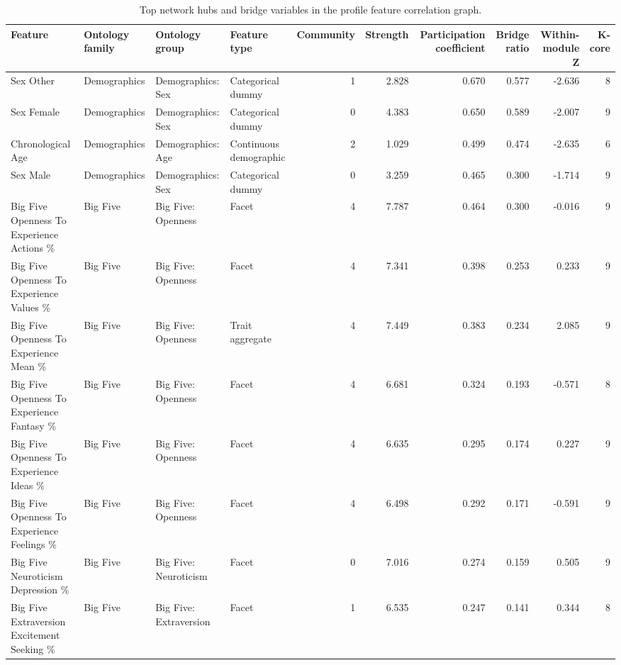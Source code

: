 \begin{table}[htbp]
\centering
\begin{threeparttable}
\caption{Top network hubs and bridge variables in the profile feature correlation graph.}
\label{tab:networksummary}
\small
\setlength{\tabcolsep}{4.5pt}
\renewcommand{\arraystretch}{1.10}
\begin{adjustbox}{max width=\linewidth}
\begin{tabular}{llllrrrrrr}
\toprule
Feature & Ontology family & Ontology group & Feature type & Community & Strength & Participation coefficient & Bridge ratio & Within-module Z & K-core \\
\midrule
Sex Other & Demographics & Demographics: Sex & Categorical dummy & 1 & 2.828 & 0.670 & 0.577 & -2.636 & 8 \\
Sex Female & Demographics & Demographics: Sex & Categorical dummy & 0 & 4.383 & 0.650 & 0.589 & -2.007 & 9 \\
Chronological Age & Demographics & Demographics: Age & Continuous demographic & 2 & 1.029 & 0.499 & 0.474 & -2.635 & 6 \\
Sex Male & Demographics & Demographics: Sex & Categorical dummy & 0 & 3.259 & 0.465 & 0.300 & -1.714 & 9 \\
Big Five Openness To Experience Actions \% & Big Five & Big Five: Openness & Facet & 4 & 7.787 & 0.464 & 0.300 & -0.016 & 9 \\
Big Five Openness To Experience Values \% & Big Five & Big Five: Openness & Facet & 4 & 7.341 & 0.398 & 0.253 & 0.233 & 9 \\
Big Five Openness To Experience Mean \% & Big Five & Big Five: Openness & Trait aggregate & 4 & 7.449 & 0.383 & 0.234 & 2.085 & 9 \\
Big Five Openness To Experience Fantasy \% & Big Five & Big Five: Openness & Facet & 4 & 6.681 & 0.324 & 0.193 & -0.571 & 8 \\
Big Five Openness To Experience Ideas \% & Big Five & Big Five: Openness & Facet & 4 & 6.635 & 0.295 & 0.174 & 0.227 & 9 \\
Big Five Openness To Experience Feelings \% & Big Five & Big Five: Openness & Facet & 4 & 6.498 & 0.292 & 0.171 & -0.591 & 9 \\
Big Five Neuroticism Depression \% & Big Five & Big Five: Neuroticism & Facet & 0 & 7.016 & 0.274 & 0.159 & 0.505 & 9 \\
Big Five Extraversion Excitement Seeking \% & Big Five & Big Five: Extraversion & Facet & 1 & 6.535 & 0.247 & 0.141 & 0.344 & 8 \\

\end{tabular}
\end{adjustbox}
\end{threeparttable}
\end{table}
